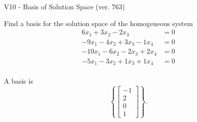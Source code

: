 \begin{exercise}
  \begin{exerciseTitle}V10 - Basis of Solution Space (ver. 763)\end{exerciseTitle}
  \begin{exerciseStatement}
    Find a basis for the solution space of the homogeneous system 
\begin{align*}
 6 x_ 1 + 3 x_ 2 -2 x_ 3 &= 0  \\ 
  -9 x_ 1 -4 x_ 2 + 3 x_ 3 -1 x_ 4 &= 0  \\ 
  -10 x_ 1 -6 x_ 2 -2 x_ 3 + 2 x_ 4 &= 0  \\ 
  -5 x_ 1 -3 x_ 2 + 1 x_ 3 + 1 x_ 4 &= 0  \\ 
 \end{align*}


 
  \end{exerciseStatement}

  \begin{exerciseAnswer}
   A basis is   
\[\left\{\left[\begin{array}{c}
-1 \\
2 \\
0 \\
1
\end{array}\right]\right\}.\]

  


  \end{exerciseAnswer}
\end{exercise}